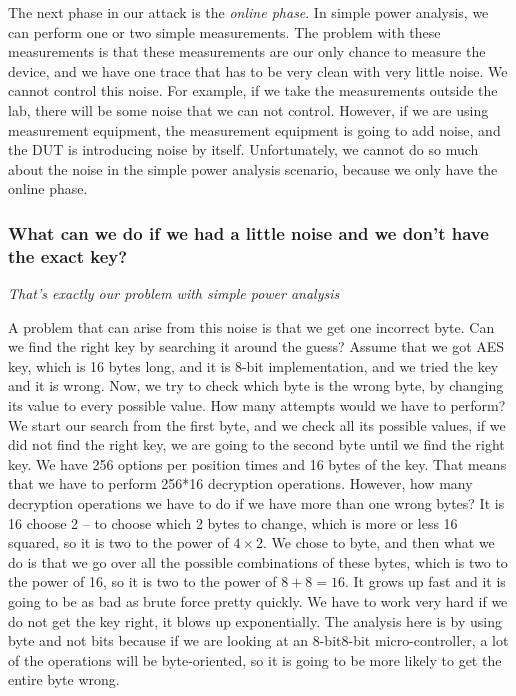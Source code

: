 The next phase in our attack is the \textit{online phase}. 
In simple power analysis, we can perform one or two simple measurements.
The problem with these measurements is that these measurements are our only chance to measure the device, and we have one trace that has to be very clean with very little noise. 
We cannot control this noise.
For example, if we take the measurements outside the lab, there will be some noise that we can not control. 
However, if we are using measurement equipment, the measurement equipment is going to add noise, and the DUT is introducing noise by itself.
Unfortunately, we cannot do so much about the noise in the simple power analysis scenario, because we only have the online phase.

\subsubsection{What can we do if we had a little noise and we don't have the exact key?}

\textit{That's exactly our problem with simple power analysis}

A problem that can arise from this noise is that we get one incorrect byte.
Can we find the right key by searching it around the guess?
Assume that we got AES key, which is 16 bytes long, and it is 8-bit implementation, and we tried the key and it is wrong.
Now, we try to check which byte is the wrong byte, by changing its value to every possible value.
How many attempts would we have to perform?
We start our search from the first byte, and we check all its possible values, if we did not find the right key, we are going to the second byte until we find the right key.
We have 256 options per position times and 16 bytes of the key.
That means that we have to perform 256*16 decryption operations.
However, how many decryption operations we have to do if we have more than one wrong bytes?
It is 16 choose 2 – to choose which 2 bytes to change, which is more or less 16 squared, so it is two to the power of $4\times2$.
We chose to byte, and then what we do is that we go over all the possible combinations of these bytes, which is two to the power of 16, so it is two to the power of $8+8=16$.
It grows up fast and it is going to be as bad as brute force pretty quickly.
We have to work very hard if we do not get the key right, it blows up exponentially.
The analysis here is by using byte and not bits because if we are looking at an 8-bit8-bit micro-controller, a lot of the operations will be byte-oriented, so it is going to be more likely to get the entire byte wrong.

